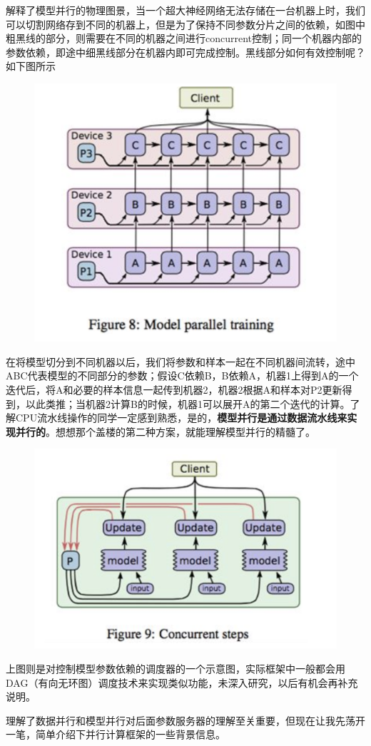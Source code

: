 \documentclass[12pt]{article}
\begin{document}
解释了模型并行的物理图景，当一个超大神经网络无法存储在一台机器上时，我们可以切割网络存到不同的机器上，但是为了保持不同参数分片之间的依赖，如图中粗黑线的部分，则需要在不同的机器之间进行concurrent控制；同一个机器内部的参数依赖，即途中细黑线部分在机器内即可完成控制。黑线部分如何有效控制呢？如下图所示
\begin{figure}[H]
    \centering
    \includegraphics[width=.5\textwidth]{fig/Large_Scale_Model_Parallerism_Training.png}
\end{figure}

在将模型切分到不同机器以后，我们将参数和样本一起在不同机器间流转，途中ABC代表模型的不同部分的参数；假设C依赖B，B依赖A，机器1上得到A的一个迭代后，将A和必要的样本信息一起传到机器2，机器2根据A和样本对P2更新得到，以此类推；当机器2计算B的时候，机器1可以展开A的第二个迭代的计算。了解CPU流水线操作的同学一定感到熟悉，是的，\textbf{模型并行是通过数据流水线来实现并行的}。想想那个盖楼的第二种方案，就能理解模型并行的精髓了。
\begin{figure}[H]
    \centering
    \includegraphics[width=.6\textwidth]{fig/Large_Scale_Concurrent.png}
\end{figure}
上图则是对控制模型参数依赖的调度器的一个示意图，实际框架中一般都会用DAG（有向无环图）调度技术来实现类似功能，未深入研究，以后有机会再补充说明。

理解了数据并行和模型并行对后面参数服务器的理解至关重要，但现在让我先荡开一笔，简单介绍下并行计算框架的一些背景信息。
\end{document}
